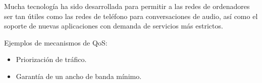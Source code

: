 \documentclass[a4paper, 11pt]{article} %
\begin{document}
	Mucha tecnología ha sido desarrollada para permitir a las redes de ordenadores ser tan útiles como las redes de teléfono para conversaciones de audio, así como el soporte de nuevas aplicaciones con demanda de servicios más estrictos.
	
	Ejemplos de mecanismos de QoS:
	\begin{itemize}
		\item Priorización de tráfico.
		\item Garantía de un ancho de banda mínimo.
	\end{itemize}
	
\end{document}
